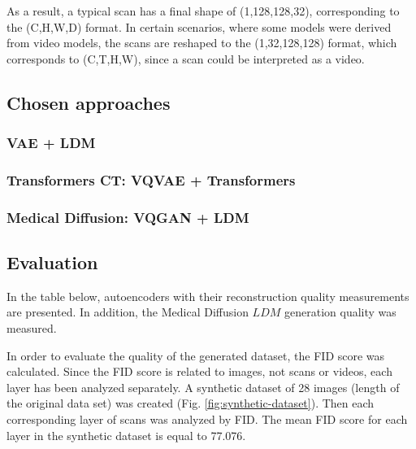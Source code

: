 As a result, a typical scan has a final shape of (1,128,128,32), corresponding to the (C,H,W,D) format. In certain scenarios, where some models were derived from video models, the scans are reshaped to the (1,32,128,128) format, which corresponds to (C,T,H,W), since a scan could be interpreted as a video.
\newpage
\subsection{Chosen approaches}
\subsubsection{VAE + LDM}


\newpage
\subsubsection{Transformers CT: VQVAE + Transformers}

\subsubsection{Medical Diffusion: VQGAN + LDM}


\newpage
\subsection{Evaluation}

In the table below, autoencoders with their reconstruction quality measurements are presented. 
In addition, the Medical Diffusion $LDM$ generation quality was measured.

In order to evaluate the quality of the generated dataset, the FID score was calculated. Since the FID score is related to images, not scans or videos, each layer has been analyzed separately. 
A synthetic dataset of 28 images (length of the original data set) was created (Fig. \ref{fig:synthetic-dataset}). Then each corresponding layer of scans was analyzed by FID. The mean FID score for each layer in the synthetic dataset is equal to 77.076. 

